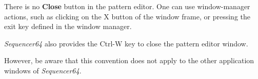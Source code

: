    There is no \textbf{Close} button in the pattern editor.  One can use
   window-manager actions, such as clicking on the X button of the window
   frame, or pressing the exit key defined in the window manager.

   \textsl{Sequencer64} also provides the Ctrl-W key to close the pattern
   editor window.

   However, be aware that this convention does not apply to the other
   application windows of \textsl{Sequencer64}.

